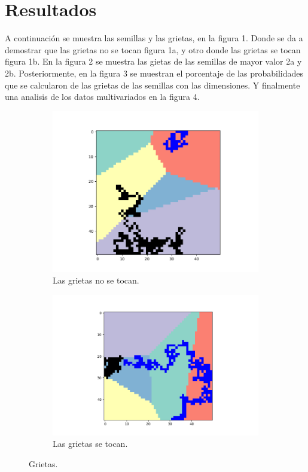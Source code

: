 \documentclass{article}
\begin{document}
\section{Resultados}\label{res}

A continuación se muestra las semillas y las grietas, en la figura 1. Donde se da a demostrar que las grietas no se tocan figura 1a, y otro donde las grietas se tocan figura 1b. En la figura 2 se muestra las gietas de las semillas de mayor valor 2a y 2b. Posteriormente, en la figura 3 se muestran el porcentaje de las probabilidades que se calcularon de las grietas de las semillas con las dimensiones. Y finalmente una analisis de los datos multivariados en la figura 4.

\begin{figure}
     \centering
     \begin{subfigure}[b]{0.40\textwidth}
         \centering
         \includegraphics[width=\textwidth]{Figure_1.png}
         \caption{Las grietas no se tocan.}
         \label{fig:notocan}
     \end{subfigure}
     \begin{subfigure}[b]{0.45\textwidth}
         \centering
         \includegraphics[width=\textwidth]{Figure_2.png}
         \caption{Las grietas se tocan.}
         \label{fig:tocan}
     \end{subfigure}
     \caption{Grietas.}
     \label{grietas}
     

\end{figure}
\end{document}
